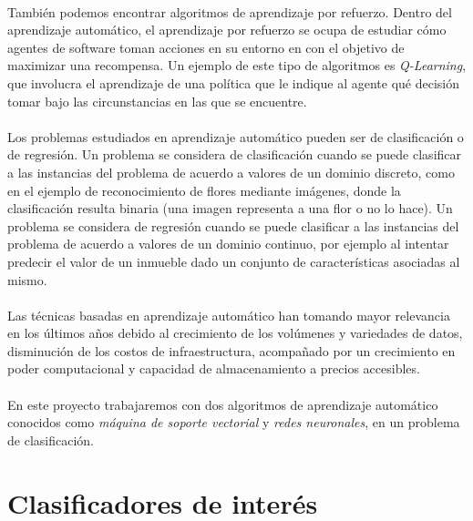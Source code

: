 \paragraph{}También podemos encontrar algoritmos de aprendizaje por refuerzo. Dentro del aprendizaje automático, el aprendizaje por refuerzo se ocupa de estudiar cómo agentes de software toman acciones en su entorno en con el objetivo de maximizar una recompensa. Un ejemplo de este tipo de algoritmos es \textit{Q-Learning}, que involucra el aprendizaje de una política que le indique al agente qué decisión tomar bajo las circunstancias en las que se encuentre.

\paragraph{}Los problemas estudiados en aprendizaje automático pueden ser de clasificación o de regresión. Un problema se considera de clasificación cuando se puede clasificar a las instancias del problema de acuerdo a valores de un dominio discreto, como en el ejemplo de reconocimiento de flores mediante imágenes, donde la clasificación resulta binaria (una imagen representa a una flor o no lo hace). Un problema se considera de regresión cuando se puede clasificar a las instancias del problema de acuerdo a valores de un dominio continuo, por ejemplo al intentar predecir el valor de un inmueble dado un conjunto de características asociadas al mismo.

\paragraph{}Las técnicas basadas en aprendizaje automático han tomando mayor relevancia en los últimos años debido al crecimiento de los volúmenes y variedades de datos, disminución de los costos de infraestructura, acompañado por un crecimiento en poder computacional y capacidad de almacenamiento a precios accesibles.

\paragraph{}En este proyecto trabajaremos con dos algoritmos de aprendizaje automático conocidos como \textit{máquina de soporte vectorial} y \textit{redes neuronales}, en un problema de clasificación.

\section{Clasificadores de interés}





